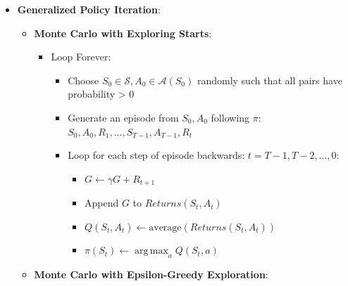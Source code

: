 \documentclass[twocolumn]{article}
\providecommand{\tightlist}{%
  \setlength{\itemsep}{\GlobalItemSep}\setlength{\parskip}{\GlobalListParSkip}}
\newlength{\GlobalItemSep}
\newlength{\GlobalListParSkip}
\DeclareMathOperator*{\argmax}{arg\,max}
\begin{document}
\begin{itemize}
\begin{itemize}
    \begin{itemize}
    \tightlist
    \item
      View \([R_{t+1} + \gamma v(S_{t+1})] - v(S_t)\) as the
      \emph{error} of the existing estimate, which acts as a correction
    \end{itemize}
  \item
    \textbf{n-step}:
    \(G_t^n = R_{t+1} + \gamma R_{t+2} + ... + \gamma^{n-1}R_{t+n} + \gamma^n v(S_{t+n})\)

    \begin{itemize}
    \tightlist
    \item
      \(v(S_t) \leftarrow v(S_t) + \alpha(G^n_t - v(S_t))\)
    \end{itemize}
  \end{itemize}
\item
  \textbf{Generalized Policy Iteration}:

  \begin{itemize}
  \tightlist
  \item
    \textbf{Monte Carlo with Exploring Starts}:

    \begin{itemize}
    \tightlist
    \item
      Loop Forever:

      \begin{itemize}
      \tightlist
      \item
        Choose \(S_0 \in \mathcal{S}, A_0 \in \mathcal{A}(S_0)\)
        randomly such that all pairs have probability \textgreater{} 0
      \item
        Generate an episode from \(S_0, A_0\) following \(\pi\):
        \(S_0, A_0, R_1, ..., S_{T-1}, A_{T-1}, R_t\)
      \item
        Loop for each step of episode backwards:
        \(t = T - 1, T - 2, ..., 0\):

        \begin{itemize}
        \tightlist
        \item
          \(G \leftarrow \gamma G + R_{t+1}\)
        \item
          Append \(G\) to \(Returns(S_t, A_t)\)
        \item
          \(Q(S_t, A_t) \leftarrow \text{average}(Returns(S_t, A_t))\)
        \item
          \(\pi(S_t) \leftarrow \argmax_{a} Q(S_t, a)\)
        \end{itemize}
      \end{itemize}
    \end{itemize}
  \item
    \textbf{Monte Carlo with Epsilon-Greedy Exploration}:


\end{itemize}
\end{itemize}
\end{document}
